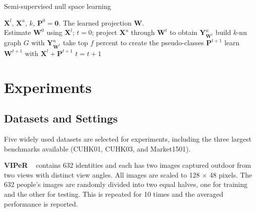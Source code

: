 \documentclass[10pt,twocolumn,letterpaper]{article}
\begin{document}
\renewcommand{\algorithmicrequire}{\textbf{Input:}}
\renewcommand{\algorithmicensure}{\textbf{Output:}}

\begin{algorithm}[!t]
\caption{Semi-supervised null space learning}
\label{alg1}
	\begin{algorithmic}[1]
		\REQUIRE $\mathbf{X}^l$, $\mathbf{X}^u$, $k$, $\mathbf{P}^0 = \mathbf{0}$.
		\ENSURE The learned projection $\mathbf{W}$.\\
		\STATE Estimate $\mathbf{W}^0$ using $\mathbf{X}^l$;
		\STATE $t=0$;
				\STATE project $\mathbf{X}^u$ through $\mathbf{W}^t$ to obtain $\mathbf{Y}^u_{\mathbf{W}^t}$
				\STATE build $k$-nn graph $G$ with $\mathbf{Y}^u_{\mathbf{W}^t}$
				\STATE take top $f$ percent to create the pseudo-classes $\mathbf{P}^{t+1}$
\STATE learn $\mathbf{W}^{t+1}$ with $\mathbf{X}^l+\mathbf{P}^{t+1}$
				 \STATE $t = t+1$
			\ENDWHILE


	\end{algorithmic}
\end{algorithm}


\section{Experiments}


\subsection{Datasets and Settings}


 \quad Five widely used datasets are selected for experiments, including the three largest benchmarks available (CUHK01, CUHK03, and Market1501).


\noindent \textbf{VIPeR} ~\cite{gray2007evaluating}  contains 632 identities and each has two images captured
outdoor
from two views with distinct view angles.
All images are scaled to 128 $\times$ 48 pixels. The 632 people's images are randomly divided into two equal halves, one for training and the other for testing. This is repeated for 10 times and the averaged performance is reported. 
\end{document}
